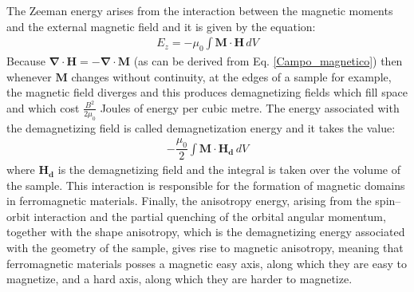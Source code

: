 \documentclass[12pt,a4paper,oneside,openany]{book}
\begin{document}
The Zeeman energy arises from the interaction between the magnetic moments and the external magnetic field and it is given by the equation:
\begin{align}
	E_z = - \mu_0 \int \mathbf{M} \cdot \mathbf{H} \, dV
\end{align}
Because $\mathbf{\nabla} \cdot \mathbf{H} = - \mathbf{\nabla} \cdot \mathbf{M}$ (as can be derived from Eq. \ref{Campo_magnetico}) then whenever $\mathbf{M}$ changes without continuity, at the edges of a sample for example, the magnetic field diverges and this produces demagnetizing fields which fill space and which cost $\frac{B^2}{2 \mu_0}$ Joules of energy per cubic metre. The energy associated with the demagnetizing field is called demagnetization energy and it takes the value:
\begin{align}
	- \dfrac{\mu_0}{2} \int \mathbf{M} \cdot \mathbf{H_d} \, dV
\end{align}
where $\mathbf{H_d}$ is the demagnetizing field and the integral is taken over the volume of the sample. This interaction is responsible for the formation of magnetic domains in ferromagnetic materials. Finally, the anisotropy energy, arising from the spin–orbit interaction and the partial quenching of the orbital angular momentum, together with the shape anisotropy, which is the demagnetizing energy associated with the geometry of the sample, gives rise to magnetic anisotropy, meaning that ferromagnetic materials posses a magnetic easy axis, along which they are easy to magnetize, and a hard axis, along which they are harder to magnetize.
\end{document}
